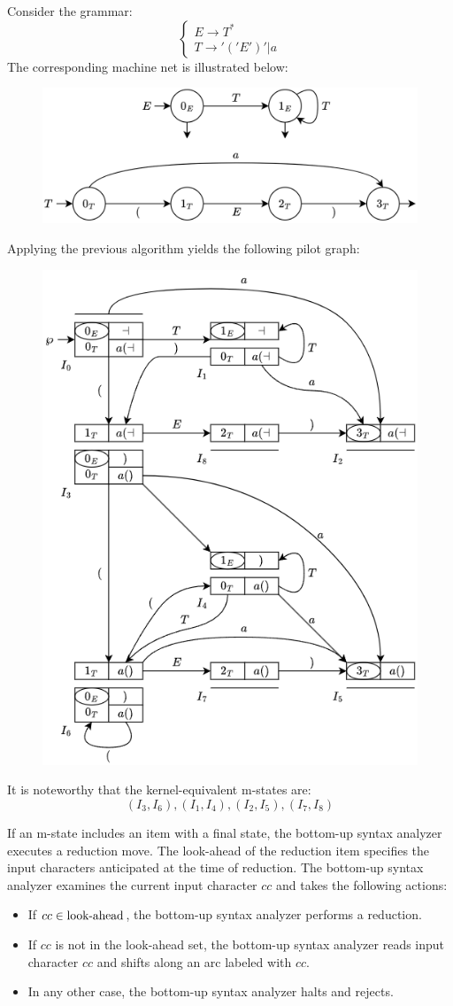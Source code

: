 \begin{example}
    Consider the grammar: 
    \[\begin{cases}
        E \rightarrow T^{*} \\
        T \rightarrow '('E')'|a
    \end{cases}\]
    The corresponding machine net is illustrated below:
    \begin{figure}[H]
        \centering
        \includegraphics[width=0.5\linewidth]{images/net2.png}
    \end{figure}
    Applying the previous algorithm yields the following pilot graph:
    \begin{figure}[H]
        \centering
        \includegraphics[width=0.4\linewidth]{images/pil.png}
    \end{figure}
    It is noteworthy that the kernel-equivalent m-states are:
    \[(I_3, I_6),(I_1, I_4),(I_2, I_5),(I_7, I_8)\]
\end{example}
If an m-state includes an item with a final state, the bottom-up syntax analyzer executes a reduction move.
The look-ahead of the reduction item specifies the input characters anticipated at the time of reduction.
The bottom-up syntax analyzer examines the current input character $cc$ and takes the following actions:
\begin{itemize}
    \item If $cc \in \textnormal{look-ahead}$, the bottom-up syntax analyzer performs a reduction.
    \item If $cc$ is not in the look-ahead set, the bottom-up syntax analyzer reads input character $cc$ and shifts along an arc labeled with $cc$.
    \item In any other case, the bottom-up syntax analyzer halts and rejects.
\end{itemize}

